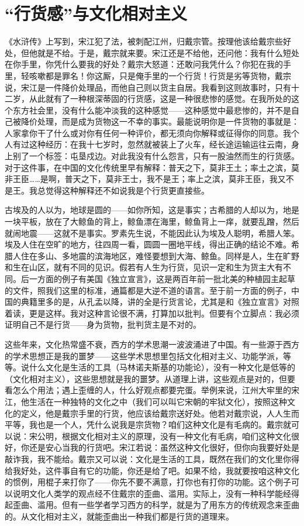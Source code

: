 \chapter{“行货感”与文化相对主义}

《水浒传》上写到，宋江犯了法，被刺配江州，归戴宗管。按理他该给戴宗些好处，但他就是不给。于是，戴宗就来要。宋江还是不给他，还问他：我有什么短处在你手里，你凭什么要我的好处？戴宗大怒道：还敢问我凭什么？你犯在我的手里，轻咳嗽都是罪名！你这厮，只是俺手里的一个行货！行货是劣等货物，戴宗说，宋江是一件降价处理品，而他自己则以货主自居。我看到这则故事时，只有十二岁，从此就有了一种根深蒂固的行货感，这是一种很悲惨的感觉。在我所处的这个东方社会里，没有什么能冲淡我的这种感觉——这种感觉中最悲惨的，并不是自己被降价处理，而是成为货物这一不幸的事实。最能说明你是一件货物的事就是：人家拿你干了什么或对你有任何一种评价，都无须向你解释或征得你的同意。我个人有过这种经历：在我十七岁时，忽然就被装上了火车，经长途运输运往云南，身上别了一个标签：屯垦戍边。对此我没有什么怨言，只有一股油然而生的行货感。对于这件事，在中国的文化传统里早有解释：普天之下，莫非王土；率土之滨，莫非王臣……是啊，普天之下，莫非王士，我不是王；率上之滨，莫非王臣，我又不是王。我总觉得这种解释还不如说我是个行货更直接些。 

古埃及的人以为，地球是圆的——如你所知，这是事实；古希腊的人却以为，地是一块平板，放在了大鲸鱼的背上，鲸鱼漂在海里，鲸鱼背上一痒，就要乱蹭，然后就闹地震——这就不是事实。罗素先生说，不能因此认为埃及人聪明，希腊人笨。埃及人住在空旷的地方，往四周一看，圆圆一圈地平线，得出正确的结论不难。希腊人住在多山、多地震的滨海地区，难怪要想到大海、鲸鱼。同样是人，生在旷野和生在山区，就有不同的见识。假若有人生为行货，见识一定和生为货主大有不同。后一方面的例子有美国《独立宣言》，这是两百年前一批北美的种植园主起草的文件，照我们这里的标准，通篇都是大逆不道的语言。至于前一方面的例子，中国的典籍里多的是，从孔孟以降，讲的全是行货言论，尤其是和《独立宣言》对照着读，更是这样。我对这种言论很不满，打算加以批判。但要有个立脚点：我必须证明自己不是行货——身为货物，批判货主是不对的。 

这些年来，文化热常盛不衰，西方的学术思潮一波波涌进了中国。有一些源于西方的学术思想正是我的噩梦——这些学术思想里包括文化相对主义、功能学派，等等。说什么文化是生活的工具（马林诺夫斯基的功能论），没有一种文化是低等的（文化相对主义），这些思想就是我的噩梦。从道理上讲，这些观点是对的，但要看怎么个用法；遇上歪缠的人，什么好观点都要完蛋。举例来说，江州大牢里的宋江，他生活在一种独特的文化之中（我们可以叫它宋朝的牢狱文化），按照这种文化的定义，他是戴宗手里的行货，他应该给戴宗送好处。他若对戴宗说，人人生而平等，我也是一个人，凭什么说我是宗货物？咱们这种文化是有毛病的。戴宗就可以说：宋公明，根据文化相对主义的原理，没有一种文化有毛病，咱们这种文化很好，你还是安心当我的行货吧。宋江若说：虽然这种文化很好，但你向我要好处是敲诈我，我不能给。戴宗又可以说：文化是生活的工具，既然在我们的文化里你得给我好处，这件事自有它的功能，你还是给了吧。如果不给，我就要按咱这种文化的惯例，用棍子来打你了——你先不要不满意，打你也有打你的功能。这个例子可以说明文化人类学的观点经不住戴宗的歪曲、滥用。实际上，没有一种科学能经得起歪曲、滥用。但有一些学者学习西方的科学，就是为了用东方的传统观念来歪曲的。从文化相对主义，就能歪曲出一种我们都是行货的道理来。 

